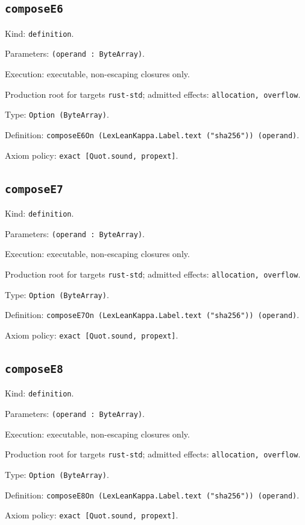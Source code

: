 \documentclass[11pt]{article}
\begin{document}
\subsection*{\texttt{composeE6}}
\noindent Kind: \texttt{definition}.\par
\noindent Parameters: \texttt{(operand : ByteArray)}.\par
\noindent Execution: executable, non-escaping closures only.\par
\noindent Production root for targets \texttt{rust-std}; admitted effects: \texttt{allocation, overflow}.\par
\noindent Type: \texttt{Option (ByteArray)}.\par
\noindent Definition: \texttt{composeE6On (LexLeanKappa.Label.text ("sha256")) (operand)}.\par
\noindent Axiom policy: \texttt{exact [Quot.sound, propext]}.\par
\subsection*{\texttt{composeE7}}
\noindent Kind: \texttt{definition}.\par
\noindent Parameters: \texttt{(operand : ByteArray)}.\par
\noindent Execution: executable, non-escaping closures only.\par
\noindent Production root for targets \texttt{rust-std}; admitted effects: \texttt{allocation, overflow}.\par
\noindent Type: \texttt{Option (ByteArray)}.\par
\noindent Definition: \texttt{composeE7On (LexLeanKappa.Label.text ("sha256")) (operand)}.\par
\noindent Axiom policy: \texttt{exact [Quot.sound, propext]}.\par
\subsection*{\texttt{composeE8}}
\noindent Kind: \texttt{definition}.\par
\noindent Parameters: \texttt{(operand : ByteArray)}.\par
\noindent Execution: executable, non-escaping closures only.\par
\noindent Production root for targets \texttt{rust-std}; admitted effects: \texttt{allocation, overflow}.\par
\noindent Type: \texttt{Option (ByteArray)}.\par
\noindent Definition: \texttt{composeE8On (LexLeanKappa.Label.text ("sha256")) (operand)}.\par
\noindent Axiom policy: \texttt{exact [Quot.sound, propext]}.\par
\end{document}
